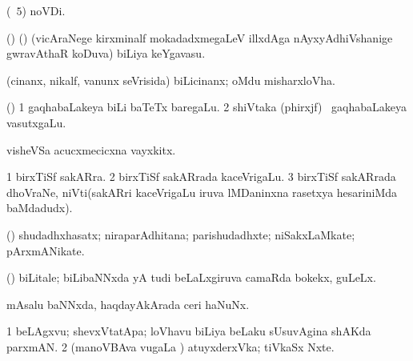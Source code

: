 {{{{{{\bentry
{}
 \gl{\nA}\bmng
{} 
\emng
\eentry

\bentry
{} 
\gl{\nA}
\expl{}
\bmng
{} (\pagu\ $5$) noVDi. 
\emng
\eentry

\bentry
{}
 \gl{\nA}\bmng
(\birx) (\ca) (vicAraNege kirxminalf mokadadxmegaLeV illxdAga nAyxyAdhiVshanige gwravAthaR koDuva) biLiya keYgavasu. 
\emng
\eentry

\bentry
{}
 \gl{\nA}\bmng
(cinanx, nikalf, \mo vanunx seVrisida) biLicinanx; oMdu misharxloVha. 
\emng
\eentry

\bentry
{}
 \gl{\nA}\bmng
(\ame) 
\bnum
\num{1} gaqhabaLakeya biLi baTeTx baregaLu. 
\num{2} shiVtaka (phirxjf) \mo\ gaqhabaLakeya vasutxgaLu. 
\enum
\emng
\eentry

\bentry
{}
 \gl{\nA}\bmng
{} 
\emng
\eentry

\bentry
{}
\gl{\nA}
\bmng
visheVSa acucxmecicxna vayxkitx. 
\emng
\eentry

\bentry
{}
  \gl{\nA}\bmng
\bnum
\num{1} birxTiSf sakARra. 
\num{2} birxTiSf sakARrada kaceVrigaLu. 
\num{3} birxTiSf sakARrada dhoVraNe, niVti(sakARri kaceVrigaLu iruva lMDaninxna rasetxya hesariniMda baMdadudx). 
\enum
\emng
\eentry

\bentry
{}
 \gl{\nA}\bmng
(\rUpa) shudadhxhasatx; niraparAdhitana; parishudadhxte; niSakxLaMkate; pArxmANikate. 
\emng
\eentry

\bentry
{}
  \gl{\nA}\bmng
(\AmA) biLitale; biLibaNNxda yA tudi beLaLxgiruva camaRda bokekx, guLeLx. 
\emng
\eentry

\bentry
{}
  \gl{\nA}\bmng
{} 
\emng
\eentry

\bentry
{}
 \gl{\nA}\bmng
mAsalu baNNxda, haqdayAkArada ceri haNuNx. 
\emng
\eentry

\bentry
{}
 \gl{\nA}\bmng
\bnum
\num{1} beLAgxvu; shevxVtatApa; loVhavu biLiya beLaku sUsuvAgina shAKda parxmAN. 
\num{2} (manoVBAva \mo vugaLa \vi) atuyxderxVka; tiVkaSx Nxte. 
\enum
\emng
\eentry

}}}}}}
